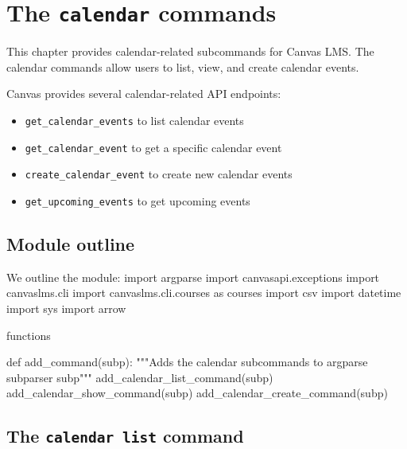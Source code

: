 \chapter{The \texttt{calendar} commands}%

This chapter provides calendar-related subcommands for Canvas LMS.
The calendar commands allow users to list, view, and create calendar events.

Canvas provides several calendar-related API endpoints:
\begin{itemize}
\item \texttt{get\_calendar\_events} to list calendar events
\item \texttt{get\_calendar\_event} to get a specific calendar event
\item \texttt{create\_calendar\_event} to create new calendar events
\item \texttt{get\_upcoming\_events} to get upcoming events
\end{itemize}

\section{Module outline}

We outline the module:
\endmoddef\nwstartdeflinemarkup\nwenddeflinemarkup
import argparse
import canvasapi.exceptions
import canvaslms.cli
import canvaslms.cli.courses as courses
import csv
import datetime
import sys
import arrow

\LA{}functions~{\nwtagstyle{}}\RA{}

def add_command(subp):
  """Adds the calendar subcommands to argparse subparser subp"""
  add_calendar_list_command(subp)
  add_calendar_show_command(subp)
  add_calendar_create_command(subp)
\nwendcode{}\nwdocspar


\section{The \texttt{calendar list} command}

